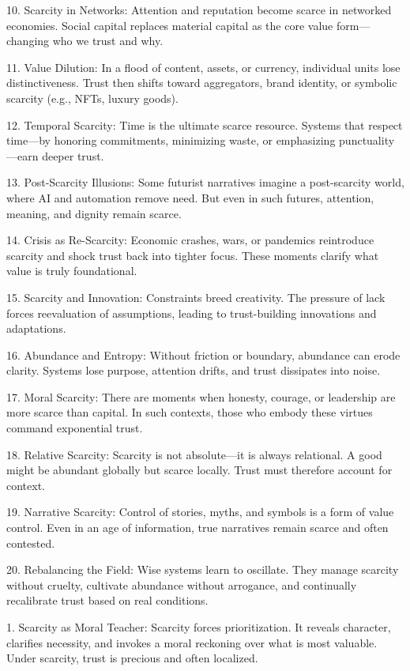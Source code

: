 \documentclass[11pt,oneside]{book}
\begin{document}
10. Scarcity in Networks:
Attention and reputation become scarce in networked economies. Social capital replaces material capital as the core value form—changing who we trust and why.

11. Value Dilution:
In a flood of content, assets, or currency, individual units lose distinctiveness. Trust then shifts toward aggregators, brand identity, or symbolic scarcity (e.g., NFTs, luxury goods).

12. Temporal Scarcity:
Time is the ultimate scarce resource. Systems that respect time—by honoring commitments, minimizing waste, or emphasizing punctuality—earn deeper trust.

13. Post-Scarcity Illusions:
Some futurist narratives imagine a post-scarcity world, where AI and automation remove need. But even in such futures, attention, meaning, and dignity remain scarce.

14. Crisis as Re-Scarcity:
Economic crashes, wars, or pandemics reintroduce scarcity and shock trust back into tighter focus. These moments clarify what value is truly foundational.

15. Scarcity and Innovation:
Constraints breed creativity. The pressure of lack forces reevaluation of assumptions, leading to trust-building innovations and adaptations.

16. Abundance and Entropy:
Without friction or boundary, abundance can erode clarity. Systems lose purpose, attention drifts, and trust dissipates into noise.

17. Moral Scarcity:
There are moments when honesty, courage, or leadership are more scarce than capital. In such contexts, those who embody these virtues command exponential trust.

18. Relative Scarcity:
Scarcity is not absolute—it is always relational. A good might be abundant globally but scarce locally. Trust must therefore account for context.

19. Narrative Scarcity:
Control of stories, myths, and symbols is a form of value control. Even in an age of information, true narratives remain scarce and often contested.

20. Rebalancing the Field:
Wise systems learn to oscillate. They manage scarcity without cruelty, cultivate abundance without arrogance, and continually recalibrate trust based on real conditions.

1. Scarcity as Moral Teacher: Scarcity forces prioritization. It reveals character, clarifies necessity, and invokes a moral reckoning over what is most valuable. Under scarcity, trust is precious and often localized.
\end{document}
